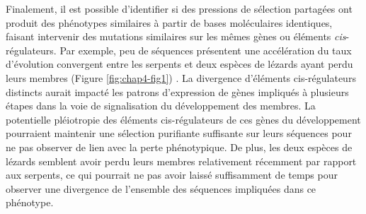 Finalement, il est possible d’identifier si des pressions de sélection partagées ont produit des phénotypes similaires à partir de bases moléculaires identiques, faisant intervenir des mutations similaires sur les mêmes gènes ou éléments \textit{cis}-régulateurs. Par exemple, peu de séquences présentent une accélération du taux d’évolution convergent entre les serpents et deux espèces de lézards ayant perdu leurs membres (Figure \ref{fig:chap4-fig1}) \citep{roscito_convergent_2022}. La divergence d’éléments \gls{cis}-régulateurs distincts aurait impacté les patrons d’expression de gènes impliqués à plusieurs étapes dans la voie de signalisation du développement des membres. La potentielle pléiotropie des éléments \gls{cis}-régulateurs de ces gènes du développement pourraient maintenir une sélection purifiante suffisante sur leurs séquences pour ne pas observer de lien avec la perte phénotypique. De plus, les deux espèces de lézards semblent avoir perdu leurs membres relativement récemment par rapport aux serpents, ce qui pourrait ne pas avoir laissé suffisamment de temps pour observer une divergence de l’ensemble des séquences impliquées dans ce phénotype.

